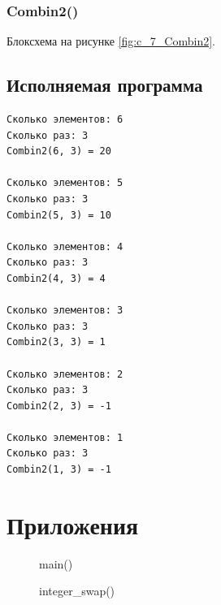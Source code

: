 \documentclass[12pt, a4paper]{article}
\begin{document}
\subsubsection{Combin2()}
Блоксхема на рисунке \ref{fig:c_7_Combin2}.



\subsection{Исполняемая программа}

\begin{verbatim}
Сколько элементов: 6
Сколько раз: 3    
Combin2(6, 3) = 20

Сколько элементов: 5
Сколько раз: 3
Combin2(5, 3) = 10

Сколько элементов: 4
Сколько раз: 3
Combin2(4, 3) = 4

Сколько элементов: 3
Сколько раз: 3
Combin2(3, 3) = 1

Сколько элементов: 2
Сколько раз: 3
Combin2(2, 3) = -1

Сколько элементов: 1
Сколько раз: 3
Combin2(1, 3) = -1
\end{verbatim}

\labconclusion{}

\newpage

\section{Приложения}

\begin{figure}[h]
    \caption{main()}
    \label{fig:a_25_main}
\end{figure}

\begin{figure}[h]
    \caption{integer\_swap()}
    \label{fig:a_25_integer_swap}
\end{figure}
\end{document}
